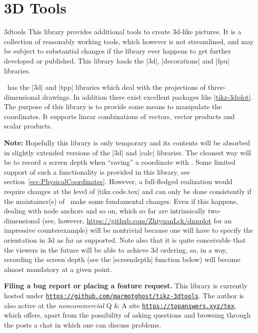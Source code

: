 \documentclass[a4paper,fleqn]{ltxdoc}
\begin{document}
\section{3D Tools}
\begin{tikzlibrary}{3dtools}
	This library provides additional tools to create 3d-like pictures. It is a
	collection of reasonably working tools, which however is not streamlined,
	and may be subject to substantial changes if the library ever happens to get
	further developed or published. This library loads the |3d|, |decorations|
	and |fpu| libraries.
\end{tikzlibrary}

\tikzname\ has the |3d| and |tpp| libraries which deal with the projections of
three-dimensional drawings. In addition there exist excellent packages like
\href{https://ctan.org/pkg/tikz-3dplot?lang=en}{|tikz-3dplot|}. The purpose of
this library is to provide some means to manipulate the coordinates. It supports
linear combinations of vectors, vector products and scalar products. 

\noindent\textbf{Note:} Hopefully this library is only temporary and its
contents will be absorbed in slightly extended versions of the |3d| and |calc|
libraries. The cleanest way will be to record a screen depth when ``saving'' a
coordinate with \tikzname. Some limited support of such a functionality is
provided in this library, see section~\ref{sec:PhysicalCoordinates}. However, a
full-fledged realization would require changes at the level of |tikz.code.tex|
and can only be done consistently if the maintainer(s) of \tikzname\ make some
fundamental changes. Even if this happens, dealing with node anchors and so on,
which so far are intrinsically two-dimensional (see, however,
\href{https://github.com/ZhiyuanLck/dnnplot}{https://github.com/ZhiyuanLck/dnnplot}
for an impressive counterexample) will be nontrivial because one will have to
specify the orientation in 3d as far as supported. Note also that it is quite
conceivable that the viewers in the future will be able to achieve 3d ordering,
so, in a way, recording the screen depth (see the |screendepth| function below)
will become almost mandatory at a given point. 

\noindent\textbf{Filing a bug report or placing a feature request.} This library
is currently hosted under
\href{https://github.com/marmotghost/tikz-3dtools}{\texttt{https://github.com/marmotghost/tikz-3dtools}}.
The author is also active at the \emph{noncommercial} Q \& A site
\href{https://topanswers.xyz/tex}{\texttt{https://topanswers.xyz/tex}}, which
offers, apart from the possibility of asking questions and browsing through the
posts a chat in which one can discuss problems. 
\end{document}
